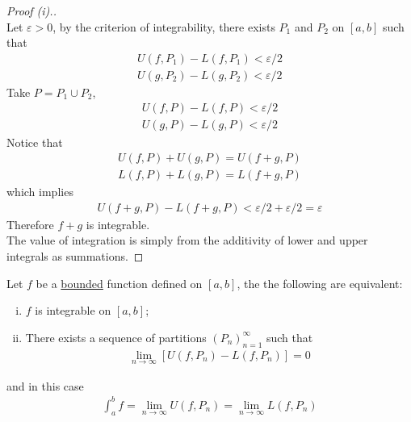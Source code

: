 \documentclass[11pt]{article}
\begin{document}
	\begin{proof}[Proof (i).] \quad \\
		Let $\varepsilon > 0$, by the criterion of integrability, there exists $P_1$ and $P_2$ on $[a, b]$ such that
		\begin{align}
			U(f, P_1) - L(f, P_1) < \varepsilon / 2 \\
			U(g, P_2) - L(g, P_2) < \varepsilon / 2
		\end{align}
		Take $P = P_1 \cup P_2$,
		\begin{align}
			U(f, P) - L(f, P) < \varepsilon / 2 \\
			U(g, P) - L(g, P) < \varepsilon / 2
		\end{align}
		Notice that
		\begin{align}
			U(f, P) + U(g, P) = U(f+g, P) \\
			L(f, P) + L(g, P) = L(f+g, P)
		\end{align}
		which implies
		\begin{align}
			U(f+g, P) - L(f+g, P) < \varepsilon/2 + \varepsilon/2 = \varepsilon
		\end{align}
		Therefore $f+g$ is integrable. \\
		The value of integration is simply from the additivity of lower and upper integrals as summations.
	\end{proof}
	
	\begin{theorem}
		Let $f$ be a \ul{bounded} function defined on $[a, b]$, the the following are equivalent:
		\begin{enumerate}[(i)]
			\item $f$ is integrable on $[a, b]$;
			\item There exists a sequence of partitions $(P_n)_{n=1}^\infty$ such that
			\begin{align}
				\lim_{n \to \infty} [U(f, P_n) - L(f, P_n)] = 0
			\end{align}
		\end{enumerate}
		and in this case
		\begin{align}
			\int_a^b f = \lim_{n \to \infty} U(f, P_n) = \lim_{n \to \infty} L(f, P_n)
		\end{align}
	\end{theorem}
	
\end{document}
